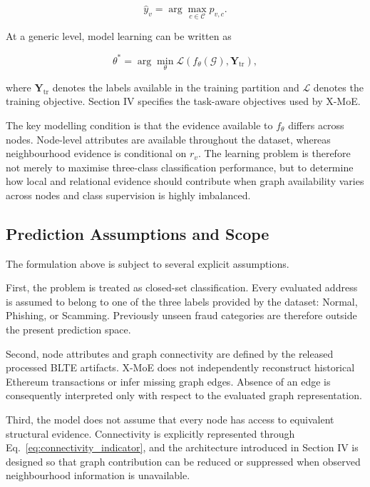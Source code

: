\documentclass{ieeeaccess}
\begin{document}
\begin{equation}
\hat{y}_v
=
\arg\max_{c\in\mathcal{C}}p_{v,c}.
\end{equation}

At a generic level, model learning can be written as

\begin{equation}
\theta^{\ast}
=
\arg\min_{\theta}
\mathcal{L}
\left(
f_{\theta}(\mathcal{G}),
\mathbf{Y}_{\mathrm{tr}}
\right),
\label{eq:generic_objective}
\end{equation}

where $\mathbf{Y}_{\mathrm{tr}}$ denotes the labels available in the training partition and $\mathcal{L}$ denotes the training objective. Section IV specifies the task-aware objectives used by X-MoE.

The key modelling condition is that the evidence available to $f_{\theta}$ differs across nodes. Node-level attributes are available throughout the dataset, whereas neighbourhood evidence is conditional on $r_v$. The learning problem is therefore not merely to maximise three-class classification performance, but to determine how local and relational evidence should contribute when graph availability varies across nodes and class supervision is highly imbalanced.

\subsection{Prediction Assumptions and Scope}

The formulation above is subject to several explicit assumptions.

First, the problem is treated as closed-set classification. Every evaluated address is assumed to belong to one of the three labels provided by the dataset: Normal, Phishing, or Scamming. Previously unseen fraud categories are therefore outside the present prediction space.

Second, node attributes and graph connectivity are defined by the released processed BLTE artifacts. X-MoE does not independently reconstruct historical Ethereum transactions or infer missing graph edges. Absence of an edge is consequently interpreted only with respect to the evaluated graph representation.

Third, the model does not assume that every node has access to equivalent structural evidence. Connectivity is explicitly represented through Eq.~\ref{eq:connectivity_indicator}, and the architecture introduced in Section IV is designed so that graph contribution can be reduced or suppressed when observed neighbourhood information is unavailable.
\end{document}
